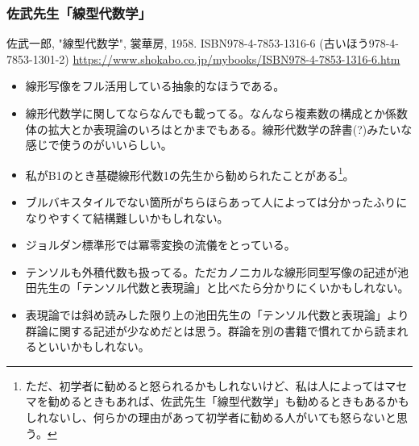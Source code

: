 \documentclass[10pt,a4paper]{jsarticle}
\begin{document}
\subsubsection*{佐武先生「線型代数学」}
佐武一郎, "線型代数学", 裳華房, 1958. ISBN978-4-7853-1316-6 (古いほう978-4-7853-1301-2) \url{https://www.shokabo.co.jp/mybooks/ISBN978-4-7853-1316-6.htm}
\begin{itemize}
    \item 線形写像をフル活用している抽象的なほうである。
    \item 線形代数学に関してならなんでも載ってる。なんなら複素数の構成とか係数体の拡大とか表現論のいろはとかまでもある。線形代数学の辞書(?)みたいな感じで使うのがいいらしい。
    \item 私がB1のとき基礎線形代数1の先生から勧められたことがある\footnote{ただ、初学者に勧めると怒られるかもしれないけど、私は人によってはマセマを勧めるときもあれば、佐武先生「線型代数学」も勧めるときもあるかもしれないし、何らかの理由があって初学者に勧める人がいても怒らないと思う。}。
    \item ブルバキスタイルでない箇所がちらほらあって人によっては分かったふりになりやすくて結構難しいかもしれない。
    \item ジョルダン標準形では冪零変換の流儀をとっている。
    \item テンソルも外積代数も扱ってる。ただカノニカルな線形同型写像の記述が池田先生の「テンソル代数と表現論」と比べたら分かりにくいかもしれない。
    \item 表現論では斜め読みした限り上の池田先生の「テンソル代数と表現論」より群論に関する記述が少なめだとは思う。群論を別の書籍で慣れてから読まれるといいかもしれない。
\end{itemize}
\end{document}
